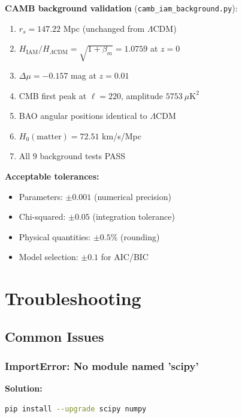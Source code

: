 \documentclass[11pt]{article}
\begin{document}
\noindent\textbf{CAMB background validation} (\texttt{camb\_iam\_background.py}):
\begin{enumerate}
    \item[$\square$] $r_s = 147.22$ Mpc (unchanged from $\Lambda$CDM)
    \item[$\square$] $H_\text{IAM}/H_{\Lambda\text{CDM}} = \sqrt{1 + \beta_m} = 1.0759$ at $z = 0$
    \item[$\square$] $\Delta\mu = -0.157$ mag at $z = 0.01$
    \item[$\square$] CMB first peak at $\ell = 220$, amplitude $5753~\mu\text{K}^2$
    \item[$\square$] BAO angular positions identical to $\Lambda$CDM
    \item[$\square$] $H_0(\text{matter}) = 72.51$ km/s/Mpc
    \item[$\square$] All 9 background tests PASS
\end{enumerate}

\noindent\textbf{Acceptable tolerances:}
\begin{itemize}
    \item Parameters: $\pm 0.001$ (numerical precision)
    \item Chi-squared: $\pm 0.05$ (integration tolerance)
    \item Physical quantities: $\pm 0.5\%$ (rounding)
    \item Model selection: $\pm 0.1$ for AIC/BIC
\end{itemize}

\section{Troubleshooting}

\subsection{Common Issues}

\subsubsection{ImportError: No module named 'scipy'}

\textbf{Solution:}
\begin{lstlisting}[language=bash]
pip install --upgrade scipy numpy
\end{lstlisting}
\end{document}
